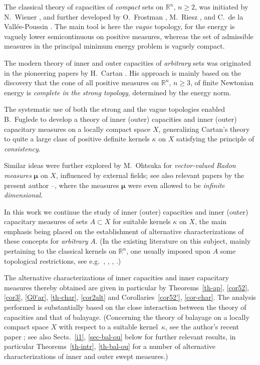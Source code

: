 \documentclass[12pt,a4paper,reqno]{amsart} %
\theoremstyle{lause}
\theoremstyle{maaritelma}
\theoremstyle{lause}
\theoremstyle{maaritelma}
\numberwithin{equation}{section}
\begin{document}
The classical theory of capacities of {\it compact\/} sets on $\mathbb R^n$, $n\geqslant2$, was  initiated by N.~Wiener \cite{NW}, and further developed by O.~Frostman \cite{Fr}, M.~Riesz \cite{Riesz}, and C.~de la Val\-l\'{e}e-Pou\-ssin \cite{V}. The main tool is here the {\it vague\/} topology, for the energy is vaguely lower semicontinuous
on positive measures, whereas the set of admissible measures in the principal minimum energy problem is vaguely compact.

The modern theory of inner and outer capacities of {\it arbitrary\/} sets was originated in the pioneering papers by H.~Cartan \cite{Ca1,Ca2}. His approach is mainly based on the discovery that the cone of all positive measures on $\mathbb R^n$, $n\geqslant3$, of finite Newtonian energy is {\it complete in the strong topology}, determined by the energy norm.

The systematic use of both the strong and the vague topologies enabled B.~Fuglede \cite{F1} to develop a theory of inner (outer) capacities and inner (outer) capacitary measures on a locally compact space $X$, generalizing Cartan's theory to quite a large class of positive definite kernels $\kappa$ on $X$ satisfying the principle of {\it consistency}.

Similar ideas were further explored by M.~Ohtsuka \cite{O} for {\it vec\-tor-val\-ued Radon measures\/} $\boldsymbol{\mu}$ on $X$, influenced by external fields; see also relevant papers
by the present author \cite{Z4}--\cite{ZPot3}, where the measures $\boldsymbol{\mu}$ were even allowed to be {\it infinite dimensional}.

In this work we continue the study of inner (outer) capacities and inner (outer) capacitary measures of sets $A\subset X$ for suitable kernels $\kappa$ on $X$, the main emphasis being placed on the establishment of alternative characterizations of these concepts for {\it arbitrary\/} $A$. (In the existing literature on this subject, mainly pertaining to the classical  kernels on $\mathbb R^n$, one usually imposed upon $A$ some topological restrictions, see e.g.\
\cite[p.~138]{AG}, \cite[p.~241--243]{Doob},
\cite[p.~138--139]{L}, \cite{V0,NW}.)

The alternative characterizations of inner capacities and inner capacitary measures thereby obtained are given in particular by Theorems~\ref{th-ap}, \ref{cor52}, \ref{cor3}, \ref{G0'ar}, \ref{th-char}, \ref{cor2alt} and Corollaries~\ref{cor52'}, \ref{cor-char}.
The analysis performed is substantially based on the close interaction between the theory of capacities and that of balayage.
(Concerning the theory of balayage on a locally compact space $X$ with respect to a suitable kernel~$\kappa$, see the author's recent paper \cite{Z-arx1}; see also Sects.~\ref{i1}, \ref{sec-bal-ou} below for further relevant results, in particular Theorems~\ref{th-intr}, \ref{th-bal-ou} for a number of alternative characterizations of inner and outer swept measures.)
\end{document}
